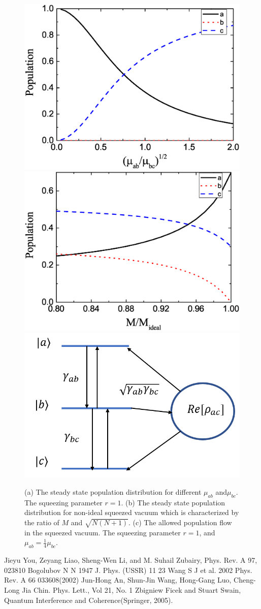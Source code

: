 \documentclass[aps,showpacs,onecolumn,twoside,groupedaddress]{revtex4}
\begin{document}
\begin{figure}
\includegraphics[width=0.48\columnwidth]{atom_fig4.eps}
\includegraphics[width=0.48\columnwidth]{atom_fig5.eps}
\includegraphics[width=0.4\columnwidth]{atom_fig3.png}
\caption{(a) The steady state population distribution for different $\mu_{ab}$ and$\mu_{bc}$. The squeezing parameter $r=1$. (b) The steady state population distribution for non-ideal squeezed vacuum which is characterized by the ratio of $M$ and $\sqrt{N(N+1)}$. (c) The allowed population flow in the squeezed vacuum. The squeezing parameter $r=1$, and $\mu_{ab}=\frac{1}{4}\mu_{bc}$.}
\label{2}
\end{figure}



\begin{thebibliography}{99}
 Jieyu You, Zeyang Liao, Sheng-Wen Li, and M. Suhail Zubairy, Phys. Rev. A 97, 023810 
 Bogolubov N N 1947 J. Phys. (USSR) 11 23
 Wang S J et al. 2002 Phys. Rev. A 66 033608(2002)
 Jun-Hong An, Shun-Jin Wang, Hong-Gang Luo, Cheng-Long Jia Chin. Phys. Lett., Vol 21, No. 1
 Zbigniew Ficek and Stuart Swain, Quantum Interference
and Coherence(Springer, 2005).

\end{thebibliography} 
\end{document}
